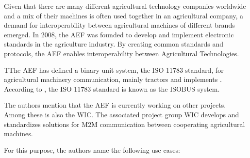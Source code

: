 Given that there are many different agricultural technology companies worldwide and a mix of their machines is often used together in an agricultural company, a demand for interoperability between agricultural machines of different brands emerged. In 2008, the \ac{AEF} was founded to develop and implement electronic standards in the agriculture industry. By creating common standards and protocols, the \ac{AEF} enables interoperability between Agricultural Technologies.

TThe AEF has defined a binary unit system, the ISO 11783 standard, for agricultural machinery communication, mainly tractors and implements \cite{iglesias_enabling_2014}. According to \textcite{schlingmann_aef_2019}, the ISO 11783 standard is known as the ISOBUS system.

The authors mention that the AEF is currently working on other projects. Among these is also the \ac{WIC}. The associated project group \ac{WIC} develops and standardizes solutions for \ac{M2M} communication between cooperating agricultural machines.

For this purpose, the authors name the following use cases:


